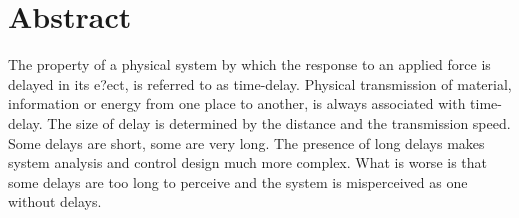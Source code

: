 \chapter*{Abstract}
The property of a physical system by which the response to an applied force is delayed in its e?ect, is referred to as time-delay. Physical transmission of material, information or energy from one place to another, is always associated with time-delay. The size of delay is determined by the distance and the transmission speed. Some delays are short, some are very long. The presence of long delays makes system analysis and control design much more complex. What is worse is that some delays are too long to perceive and the system is misperceived as one without delays.